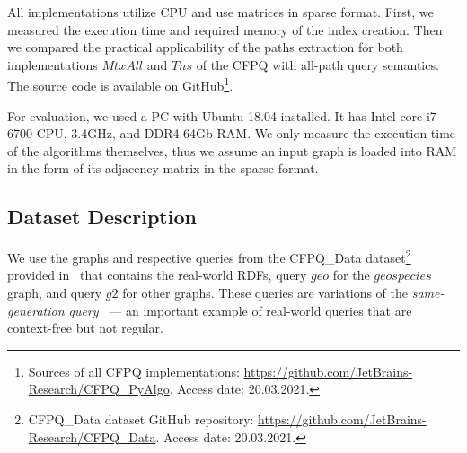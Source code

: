 All implementations utilize CPU and use matrices in sparse format. First, we measured the execution time and required memory of the index creation. Then we compared the practical applicability of the paths extraction for both implementations $MtxAll$ and $Tns$ of the CFPQ with all-path query semantics. The source code is available on GitHub\footnote{Sources of all CFPQ implementations: \url{https://github.com/JetBrains-Research/CFPQ\_PyAlgo}. Access date: 20.03.2021.}.

For evaluation, we used a PC with Ubuntu 18.04 installed.
It has Intel core i7-6700 CPU, 3.4GHz, and DDR4 64Gb RAM.
We only measure the execution time of the algorithms themselves, thus we assume an input graph is loaded into RAM in the form of its adjacency matrix in the sparse format.

\subsection{Dataset Description}

We use the graphs and respective queries from the CFPQ\_Data dataset\footnote{CFPQ\_Data dataset GitHub repository: \url{https://github.com/JetBrains-Research/CFPQ_Data}. Access date: 20.03.2021.} provided in~\cite{10.1145/3398682.3399163} that contains the real-world RDFs, query $geo$ for the $geospecies$ graph, and query $g2$ for other graphs. These queries are variations of the \textit{same-generation query}~\cite{FndDB} --- an important example of real-world queries that are context-free but not regular.




